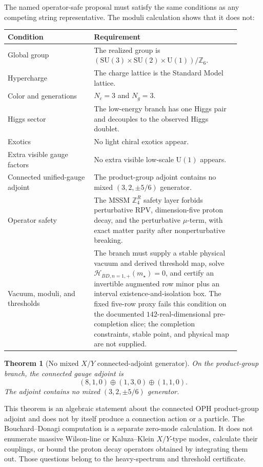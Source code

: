 \documentclass[11pt]{article}
\newtheorem{theorem}{Theorem}[section]
\theoremstyle{remark}
\theoremstyle{plain}
\newcommand{\SU}{\mathrm{SU}}
\newcommand{\U}{\mathrm{U}}
\newcommand{\Z}{\mathbb Z}
\newcommand{\ZfourR}{\mathbb Z_4^R}
\begin{document}
The named operator-safe proposal must satisfy the same conditions as any competing
string representative. The moduli calculation shows that it does not:
\begin{longtable}{L{0.33\linewidth}L{0.57\linewidth}}
\toprule
\textbf{Condition} & \textbf{Requirement} \\
\midrule
Global group & The realized group is
\((\SU(3)\times\SU(2)\times\U(1))/\Z_6\). \\
Hypercharge & The charge lattice is the Standard Model lattice. \\
Color and generations & \(N_c=3\) and \(N_g=3\). \\
Higgs sector & The low-energy branch has one Higgs pair and decouples to the observed Higgs
doublet. \\
Exotics & No light chiral exotics appear. \\
Extra visible gauge factors & No extra visible low-scale \(\U(1)\) appears. \\
Connected unified-gauge adjoint & The product-group adjoint contains no
mixed \((3,2,\pm5/6)\) generator. \\
Operator safety & The MSSM \(\ZfourR\) safety layer forbids perturbative RPV, dimension-five
proton decay, and the perturbative \(\mu\)-term, with exact matter parity after
nonperturbative breaking. \\
Vacuum, moduli, and thresholds & The branch must supply a stable physical vacuum and derived
threshold map, solve \(\mathcal H_{BD,n=1,+}(m_\star)=0\), and certify an invertible augmented
row minor plus an interval existence-and-isolation box. The fixed five-row proxy fails this condition
on the documented \(142\)-real-dimensional pre-completion slice; the completion constraints,
stable point, and physical map are not supplied. \\
\bottomrule
\end{longtable}

\begin{theorem}[No mixed \(X/Y\) connected-adjoint generator]
On the product-group branch, the connected gauge adjoint is
\[
(8,1,0)\oplus(1,3,0)\oplus(1,1,0).
\]
The adjoint contains no mixed \((3,2,\pm5/6)\) generator.
\end{theorem}

This theorem is an algebraic statement about the connected OPH product-group adjoint and does not
by itself produce a connection action or a particle. The Bouchard--Donagi computation is a
separate zero-mode calculation. It does not enumerate massive
Wilson-line or Kaluza--Klein \(X/Y\)-type modes, calculate their couplings, or bound the proton
decay operators obtained by integrating them out. Those questions belong to the heavy-spectrum
and threshold certificate.
\end{document}
